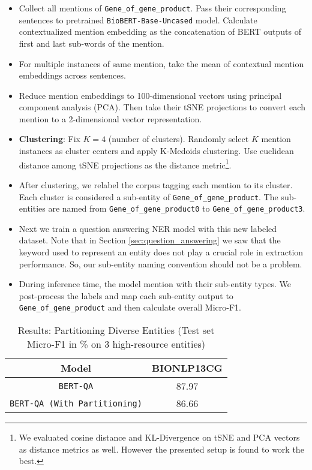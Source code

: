 \begin{itemize}
    \item Collect all mentions of \texttt{Gene\_of\_gene\_product}. Pass their corresponding sentences to pretrained \texttt{BioBERT-Base-Uncased} model. Calculate contextualized mention embedding as the concatenation of BERT outputs of first and last sub-words of the mention.
    
    \item For multiple instances of same mention, take the mean of contextual mention embeddings across sentences.
    
    \item Reduce mention embeddings to 100-dimensional vectors using principal component analysis (PCA). Then take their tSNE\cite{van2008visualizing} projections to convert each mention to a 2-dimensional vector representation.
    
    \item \textbf{Clustering}: Fix $K = 4$ (number of clusters). Randomly select $K$ mention instances as cluster centers and apply K-Medoids clustering. Use euclidean distance among tSNE projections as the distance metric\footnote{We evaluated cosine distance and KL-Divergence on tSNE and PCA vectors as distance metrics as well. However the presented setup is found to work the best.}.
    
    \item After clustering, we relabel the corpus tagging each mention to its cluster. Each cluster is considered a sub-entity of \texttt{Gene\_of\_gene\_product}. The sub-entities are named from \texttt{Gene\_of\_gene\_product0} to \texttt{Gene\_of\_gene\_product3}.
    
    \item Next we train a question answering NER model with this new labeled dataset. Note that in Section \ref{sec:question_answering} we saw that the keyword used to represent an entity does not play a crucial role in extraction performance. So, our sub-entity naming convention should not be a problem.
    
    \item During inference time, the model mention with their sub-entity types. We post-process the labels and map each sub-entity output to \texttt{Gene\_of\_gene\_product} and then calculate overall Micro-F1.
\end{itemize}

\begin{table}[h!]
\centering
\begin{tabular}{|c|c|}\hline
	\textbf{Model} & \textbf{BIONLP13CG}\\\hline
	\texttt{BERT-QA} & 87.97\\\hline
	\texttt{BERT-QA (With Partitioning)} & 86.66\\\hline
	\end{tabular}
    \caption{Results: Partitioning Diverse Entities (Test set Micro-F1 in \% on 3 high-resource entities)}
    \label{tab:res_clustering}
\end{table}

